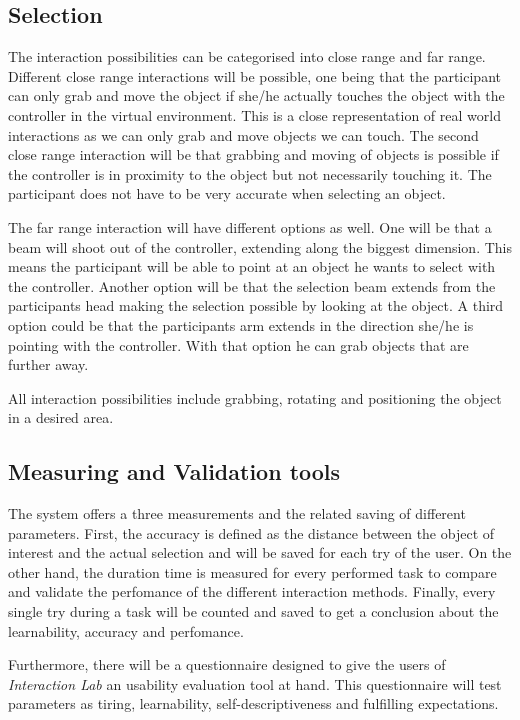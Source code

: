 \documentclass[a4paper, 12pt]{article}
\begin{document}
\subsection{Selection}
The interaction possibilities can be categorised into close range and far range. Different close range interactions will be possible, one being that the participant can only grab and move the object if she/he actually touches the object with the controller in the virtual environment. This is a close representation of real world interactions as we can only grab and move objects we can touch. 
The second close range interaction will be that grabbing and moving of objects is possible if the controller is in proximity to the object but not necessarily touching it. The participant does not have to be very accurate when selecting an object. 

The far range interaction will have different options as well. One will be that a beam will shoot out of the controller, extending along the biggest dimension. This means the participant will be able to point at an object he wants to select with the controller. 
Another option will be that the selection beam extends from the participants head making the selection possible by looking at the object. 
A third option could be that the participants arm extends in the direction she/he is pointing with the controller. With that option he can grab objects that are further away. 

All interaction possibilities include grabbing, rotating and positioning the object in a desired area.  

\subsection{Measuring and Validation tools}

 The system offers a three measurements and the related saving of different parameters. First, the accuracy is defined as the distance between the object of interest and the actual selection and will be saved for each try of the user. On the other hand, the duration time is measured for every performed task to compare and validate the perfomance of the different interaction methods. 
 Finally, every single try during a task will be counted and saved to get a conclusion about the learnability, accuracy and perfomance.
 
 Furthermore, there will be a questionnaire designed to give the users of  \textit{Interaction Lab} an usability evaluation tool at hand. This questionnaire will test parameters as tiring, learnability, self-descriptiveness and fulfilling expectations.
\end{document}
